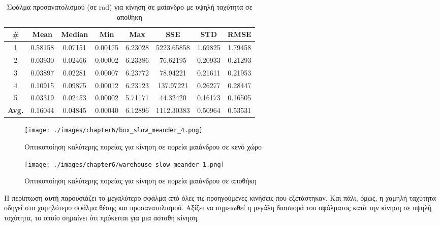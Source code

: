\begin{table}[H]
    \centering
    \caption{Σφάλμα προσανατολισμού (σε rad) για κίνηση σε μαίανδρο με υψηλή ταχύτητα σε αποθήκη}
    \label{tab:orientation_error_meander_fast_warehouse}
    \begin{tabular}{| c | c | c | c | c | c | c | c | }
        \hline
        \rowcolor{Gray}
        \# & Mean & Median & Min & Max & SSE & STD & RMSE \\
        \hline
        1 & 0.58158 & 0.07151 & 0.00175 & 6.23028 & 5223.65858 & 1.69825 & 1.79458 \\
        2 & 0.03930 & 0.02466 & 0.00002 & 6.23386 & 76.62195 & 0.20933 & 0.21293 \\
        3 & 0.03897 & 0.02281 & 0.00007 & 6.23772 & 78.94221 & 0.21611 & 0.21953 \\
        4 & 0.10915 & 0.09875 & 0.00012 & 6.23123 & 137.97221 & 0.26277 & 0.28447 \\
        5 & 0.03319 & 0.02453 & 0.00002 & 5.71171 & 44.32420 & 0.16173 & 0.16505 \\
        \hline
        \textbf{Avg.} & 0.16044 & 0.04845 & 0.00040 & 6.12896 & 1112.30383 & 0.50964 & 0.53531 \\
        \hline
    \end{tabular}
\end{table}

\begin{figure}[!ht]
    \centering
    \texttt{[image: ./images/chapter6/box\_slow\_meander\_4.png]}
    \caption{Οπτικοποίηση καλύτερης πορείας για κίνηση σε πορεία μαιάνδρου σε κενό χώρο}
    \label{fig:path_meander_slow_corridor}
\end{figure}

\begin{figure}[!ht]
    \centering
    \texttt{[image: ./images/chapter6/warehouse\_slow\_meander\_1.png]}
    \caption{Οπτικοποίηση καλύτερης πορείας για κίνηση σε πορεία μαιάνδρου σε αποθήκη}
    \label{fig:path_meander_slow_warehouse}
\end{figure}

Η περίπτωση αυτή παρουσιάζει το μεγαλύτερο σφάλμα από όλες τις προηγούμενες κινήσεις που εξετάστηκαν. Και πάλι, όμως, η χαμηλή ταχύτητα οδηγεί στο χαμηλότερο σφάλμα θέσης και προσανατολισμού. Αξίζει να σημειωθεί η μεγάλη διασπορά του σφάλματος κατά την κίνηση σε υψηλή ταχύτητα, το οποίο σημαίνει ότι πρόκειται για μια ασταθή κίνηση. 
